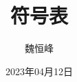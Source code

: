 \documentclass[]{beamer}
\title[语义分析]{符号表}
\author[魏恒峰]{\large 魏恒峰}
\institute{hfwei@nju.edu.cn}
\date{2023年04月12日}
\begin{document}
\maketitle


\thankyou{}

\end{document}
